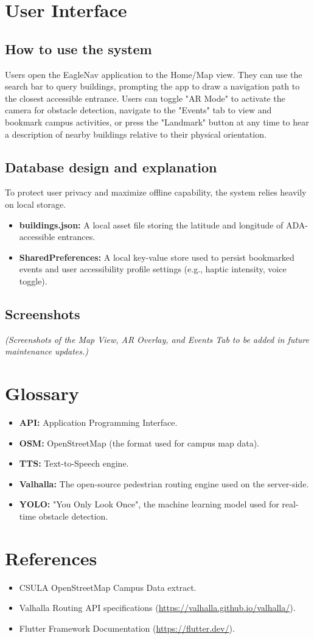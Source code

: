 \documentclass[12pt]{article}
\begin{document}
\section{User Interface}

\subsection{How to use the system}
Users open the EagleNav application to the Home/Map view. They can use the search bar to query buildings, prompting the app to draw a navigation path to the closest accessible entrance. Users can toggle "AR Mode" to activate the camera for obstacle detection, navigate to the "Events" tab to view and bookmark campus activities, or press the "Landmark" button at any time to hear a description of nearby buildings relative to their physical orientation.

\subsection{Database design and explanation}
To protect user privacy and maximize offline capability, the system relies heavily on local storage. 
\begin{itemize}[noitemsep]
    \item \textbf{buildings.json:} A local asset file storing the latitude and longitude of ADA-accessible entrances.
    \item \textbf{SharedPreferences:} A local key-value store used to persist bookmarked events and user accessibility profile settings (e.g., haptic intensity, voice toggle).
\end{itemize}

\subsection{Screenshots}
\textit{(Screenshots of the Map View, AR Overlay, and Events Tab to be added in future maintenance updates.)}

\section{Glossary}
\begin{itemize}[noitemsep]
    \item \textbf{API:} Application Programming Interface.
    \item \textbf{OSM:} OpenStreetMap (the format used for campus map data).
    \item \textbf{TTS:} Text-to-Speech engine.
    \item \textbf{Valhalla:} The open-source pedestrian routing engine used on the server-side.
    \item \textbf{YOLO:} "You Only Look Once", the machine learning model used for real-time obstacle detection.
\end{itemize}

\section{References}
\begin{itemize}[noitemsep]
    \item CSULA OpenStreetMap Campus Data extract.
    \item Valhalla Routing API specifications (\url{https://valhalla.github.io/valhalla/}).
    \item Flutter Framework Documentation (\url{https://flutter.dev/}).
\end{itemize}
\end{document}
